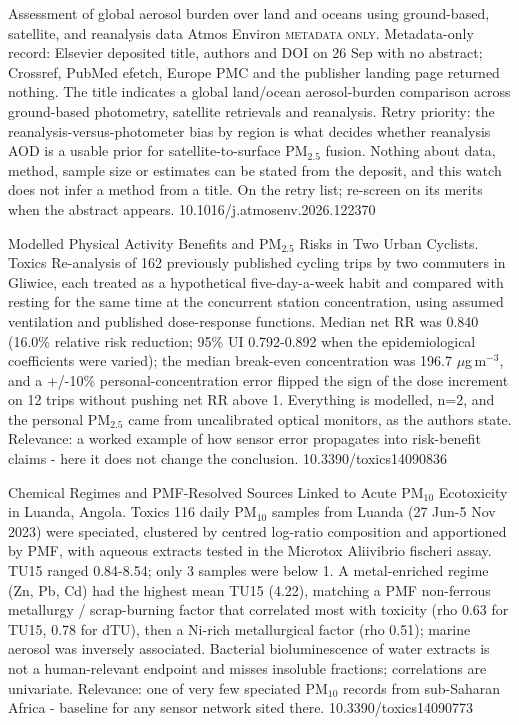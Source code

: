 \documentclass[10pt]{article}
\begin{document}
\par{}\baselineskip{}\baselineskip
{}

{Assessment of global aerosol burden over land and oceans using ground-based, satellite, and reanalysis data}
{Atmos Environ}
{\textsc{metadata only.} Metadata-only record: Elsevier deposited title, authors and DOI on 26 Sep with no abstract; Crossref, PubMed efetch, Europe PMC and the publisher landing page returned nothing. The title indicates a global land/ocean aerosol-burden comparison across ground-based photometry, satellite retrievals and reanalysis. Retry priority: the reanalysis-versus-photometer bias by region is what decides whether reanalysis AOD is a usable prior for satellite-to-surface PM$_{2.5}$ fusion. Nothing about data, method, sample size or estimates can be stated from the deposit, and this watch does not infer a method from a title. On the retry list; re-screen on its merits when the abstract appears.}
{10.1016/j.atmosenv.2026.122370}

{Modelled Physical Activity Benefits and PM$_{2.5}$ Risks in Two Urban Cyclists.}
{Toxics}
{Re-analysis of 162 previously published cycling trips by two commuters in Gliwice, each treated as a hypothetical five-day-a-week habit and compared with resting for the same time at the concurrent station concentration, using assumed ventilation and published dose-response functions. Median net RR was 0.840 (16.0\% relative risk reduction; 95\% UI 0.792-0.892 when the epidemiological coefficients were varied); the median break-even concentration was 196.7 $\mu$g\,m$^{-3}$, and a +/-10\% personal-concentration error flipped the sign of the dose increment on 12 trips without pushing net RR above 1. Everything is modelled, n=2, and the personal PM$_{2.5}$ came from uncalibrated optical monitors, as the authors state. Relevance: a worked example of how sensor error propagates into risk-benefit claims - here it does not change the conclusion.}
{10.3390/toxics14090836}

{Chemical Regimes and PMF-Resolved Sources Linked to Acute PM$_{10}$ Ecotoxicity in Luanda, Angola.}
{Toxics}
{116 daily PM$_{10}$ samples from Luanda (27 Jun-5 Nov 2023) were speciated, clustered by centred log-ratio composition and apportioned by PMF, with aqueous extracts tested in the Microtox Aliivibrio fischeri assay. TU15 ranged 0.84-8.54; only 3 samples were below 1. A metal-enriched regime (Zn, Pb, Cd) had the highest mean TU15 (4.22), matching a PMF non-ferrous metallurgy / scrap-burning factor that correlated most with toxicity (rho 0.63 for TU15, 0.78 for dTU), then a Ni-rich metallurgical factor (rho 0.51); marine aerosol was inversely associated. Bacterial bioluminescence of water extracts is not a human-relevant endpoint and misses insoluble fractions; correlations are univariate. Relevance: one of very few speciated PM$_{10}$ records from sub-Saharan Africa - baseline for any sensor network sited there.}
{10.3390/toxics14090773}
\end{document}

